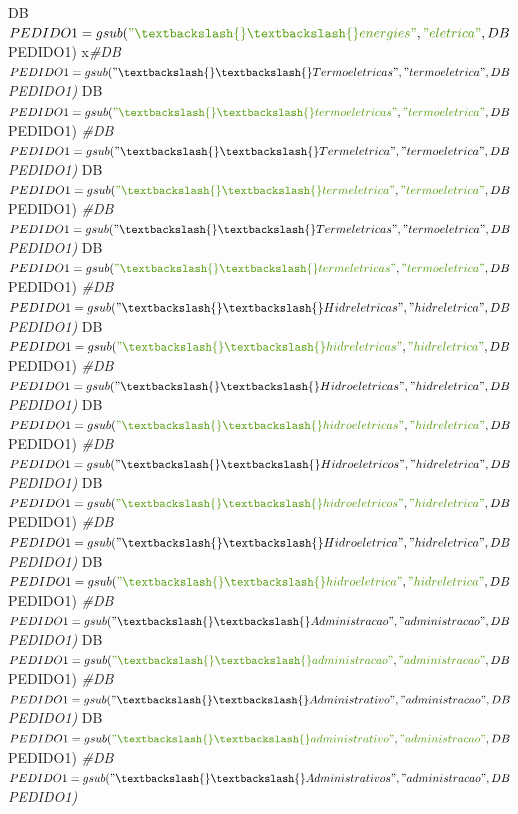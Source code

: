 \documentclass[]{article}
\newenvironment{Shaded}{\begin{snugshade}}{\end{snugshade}}
\newcommand{\CommentTok}[1]{\textcolor[rgb]{0.56,0.35,0.01}{\textit{#1}}}
\newcommand{\NormalTok}[1]{#1}
\newcommand{\StringTok}[1]{\textcolor[rgb]{0.31,0.60,0.02}{#1}}
\begin{document}
\begin{Shaded}
\begin{Highlighting}[]
\NormalTok{DB$PEDIDO1 =gsub(}\StringTok{"\textbackslash{}\textbackslash{} energies "}\NormalTok{, }\StringTok{"eletrica"}\NormalTok{, DB$PEDIDO1)}
\NormalTok{x}\CommentTok{#DB$PEDIDO1 =gsub("\textbackslash{}\textbackslash{} Termoeletricas ", "termoeletrica", DB$PEDIDO1)}
\NormalTok{DB$PEDIDO1 =gsub(}\StringTok{"\textbackslash{}\textbackslash{} termoeletricas "}\NormalTok{, }\StringTok{"termoeletrica"}\NormalTok{, DB$PEDIDO1)}
\CommentTok{#DB$PEDIDO1 =gsub("\textbackslash{}\textbackslash{} Termeletrica ", "termoeletrica", DB$PEDIDO1)}
\NormalTok{DB$PEDIDO1 =gsub(}\StringTok{"\textbackslash{}\textbackslash{} termeletrica "}\NormalTok{, }\StringTok{"termoeletrica"}\NormalTok{, DB$PEDIDO1)}
\CommentTok{#DB$PEDIDO1 =gsub("\textbackslash{}\textbackslash{} Termeletricas ", "termoeletrica", DB$PEDIDO1)}
\NormalTok{DB$PEDIDO1 =gsub(}\StringTok{"\textbackslash{}\textbackslash{} termeletricas "}\NormalTok{, }\StringTok{"termoeletrica"}\NormalTok{, DB$PEDIDO1)}
\CommentTok{#DB$PEDIDO1 =gsub("\textbackslash{}\textbackslash{} Hidreletricas ", "hidreletrica", DB$PEDIDO1)}
\NormalTok{DB$PEDIDO1 =gsub(}\StringTok{"\textbackslash{}\textbackslash{} hidreletricas "}\NormalTok{, }\StringTok{"hidreletrica"}\NormalTok{, DB$PEDIDO1)}
\CommentTok{#DB$PEDIDO1 =gsub("\textbackslash{}\textbackslash{} Hidroeletricas ", "hidreletrica", DB$PEDIDO1)}
\NormalTok{DB$PEDIDO1 =gsub(}\StringTok{"\textbackslash{}\textbackslash{} hidroeletricas "}\NormalTok{, }\StringTok{"hidreletrica"}\NormalTok{, DB$PEDIDO1)}
\CommentTok{#DB$PEDIDO1 =gsub("\textbackslash{}\textbackslash{} Hidroeletricos ", "hidreletrica", DB$PEDIDO1)}
\NormalTok{DB$PEDIDO1 =gsub(}\StringTok{"\textbackslash{}\textbackslash{} hidroeletricos "}\NormalTok{, }\StringTok{"hidreletrica"}\NormalTok{, DB$PEDIDO1)}
\CommentTok{#DB$PEDIDO1 =gsub("\textbackslash{}\textbackslash{} Hidroeletrica ", "hidreletrica", DB$PEDIDO1)}
\NormalTok{DB$PEDIDO1 =gsub(}\StringTok{"\textbackslash{}\textbackslash{} hidroeletrica "}\NormalTok{, }\StringTok{"hidreletrica"}\NormalTok{, DB$PEDIDO1)}
\CommentTok{#DB$PEDIDO1 =gsub("\textbackslash{}\textbackslash{} Administracao ", "administracao", DB$PEDIDO1)}
\NormalTok{DB$PEDIDO1 =gsub(}\StringTok{"\textbackslash{}\textbackslash{} administracao "}\NormalTok{, }\StringTok{"administracao"}\NormalTok{, DB$PEDIDO1)}
\CommentTok{#DB$PEDIDO1 =gsub("\textbackslash{}\textbackslash{} Administrativo ", "administracao", DB$PEDIDO1)}
\NormalTok{DB$PEDIDO1 =gsub(}\StringTok{"\textbackslash{}\textbackslash{} administrativo "}\NormalTok{, }\StringTok{"administracao"}\NormalTok{, DB$PEDIDO1)}
\CommentTok{#DB$PEDIDO1 =gsub("\textbackslash{}\textbackslash{} Administrativos ", "administracao", DB$PEDIDO1)}

\end{Highlighting}
\end{Shaded}
\end{document}
